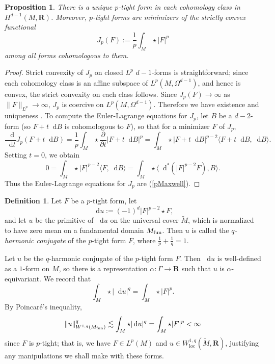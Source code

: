\documentclass[reqno,11pt]{amsart}
\newcommand{\RR}{\mathbf{R}}
\newcommand*\dif{\mathop{}\!\mathrm{d}}
\newcommand{\dfn}[1]{\emph{#1}\index{#1}}
\newcommand{\loc}{\mathrm{loc}}
\newtheorem{proposition}[theorem]{Proposition}
\theoremstyle{definition}
\newtheorem{definition}[theorem]{Definition}
\numberwithin{equation}{section}
\begin{document}
\begin{proposition}
There is a unique $p$-tight form in each cohomology class in $H^{d - 1}(M, \RR)$.
Moreover, $p$-tight forms are minimizers of the strictly convex functional
$$J_p(F) := \frac{1}{p} \int_M \star |F|^p$$
among all forms cohomologous to them.
\end{proposition}
\begin{proof}
Strict convexity of $J_p$ on closed $L^p$ $d - 1$-forms is straightforward; since each cohomology class is an affine subspace of $L^p(M, \Omega^{d - 1})$, and hence is convex, the strict convexity on each class follows.
Since $J_p(F) \to \infty$ as $\|F\|_{L^p} \to \infty$, $J_p$ is coercive on $L^p(M, \Omega^{d - 1})$.
Therefore we have existence and uniqueness \cite[Chapter II]{Ekeland99}.
To compute the Euler-Lagrange equations for $J_p$, let $B$ be a $d-2$-form (so $F + t \dif B$ is cohomologous to $F$), so that for a minimizer $F$ of $J_p$,
$$\frac{\dif}{\dif t} J_p(F + t \dif B) = \frac{1}{p} \int_M \star \frac{\partial}{\partial t} |F + t \dif B|^p = \int_M \star |F + t \dif B|^{p - 2} \langle F + t \dif B, \dif B\rangle.$$
Setting $t = 0$, we obtain 
$$0 = \int_M \star |F|^{p - 2} \langle F, \dif B\rangle = \int_M \star \langle \dif^*(|F|^{p - 2} F), B\rangle.$$
Thus the Euler-Lagrange equations for $J_p$ are (\ref{pMaxwell}).
\end{proof}

\begin{definition}
Let $F$ be a $p$-tight form, let
\begin{equation}
\dif u := (-1)^d |F|^{p - 2} \star F, \label{inverse extremality}
\end{equation}
and let $u$ be the primitive of $\dif u$ on the universal cover $\tilde M$, which is normalized to have zero mean on a fundamental domain $M_{\rm fun}$.
Then $u$ is called the \dfn{$q$-harmonic conjugate} of the $p$-tight form $F$, where $\frac{1}{p} + \frac{1}{q} = 1$.
\end{definition}

Let $u$ be the $q$-harmonic conjugate of the $p$-tight form $F$.
Then $\dif u$ is well-defined as a $1$-form on $M$, so there is a representation $\alpha: \Gamma \to \RR$ such that $u$ is $\alpha$-equivariant.
We record that 
\begin{equation}\label{q energy is p energy}
\int_M \star |\dif u|^q = \int_M \star |F|^p.
\end{equation}
By Poincar\'e's inequality,
$$\|u\|_{W^{1, q}(M_{\rm fun})}^q \lesssim \int_M \star |\dif u|^q = \int_M \star |F|^p < \infty$$
since $F$ is $p$-tight; that is, we have $F \in L^p(M)$ and $u \in W^{1, q}_\loc(\tilde M, \RR)$, justifying any manipulations we shall make with these forms.
\end{document}
